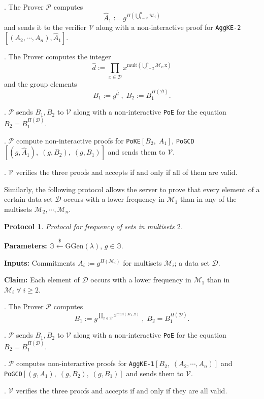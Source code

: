 \documentclass[11pt, lettersize, notitlepage, leqno, footskip=0.6cm]{article}
\newcommand{\pl}{\prod\limits}
\newcommand{\mc}{\mathcal}
\newcommand{\mb}{\mathbb}
\newcommand{\mr}{\mathrm}
\newcommand{\lamb}{\lambda}
\newcommand{\what}{\widehat}
\newcommand{\mP}{\mc{P}}
\newcommand{\V}{\mc{V}}
\newcommand{\vs}{\vspace{-0.15cm}}
\newcommand{\noin}{\noindent}
\newtheorem{Prot}[Thm]{Protocol}
\numberwithin{equation}{section}
\begin{document}
\begin{prf1}\noin {}. The Prover $\mP$ computes \vs $$\what{A}_1:= g^{\Pi\left(\bigcup\limits_{i=2}^n \mc{M}_i\right)} $$ and sends it to the verifier $\V$ along with a non-interactive proof for \verb|AggKE-2|$[(A_2,\cdots,A_n), \what{A}_1]$.

\noin 2. The Prover computes the integer \vs $$\what{d}:= \pl_{x\in \mc{D}} x^{\mr{mult\left(\bigcup\limits_{i=2}^n \mc{M}_i, x\right)}} $$ and the group elements \vs $$B_1:= g^{\what{d}}\;,\;B_2:= B_1^{\Pi(\mc{D})} .$$

\noin 3. $\mP$ sends $B_1, B_2$ to $\V$ along with a non-interactive \verb|PoE| for the equation $B_2= B_1^{\Pi(\mc{D})}$.

\noin 4. $\mP$ compute non-interactive proofs for \verb|PoKE|$[B_2,\;A_1]$, \verb|PoGCD|$[(g, \what{A}_1),\;(g, B_2),\;(g, B_1)]$ and sends them to $\V$.

\noin 5. $\V$ verifies the three proofs and accepts if and only if all of them are valid.\end{prf1}

Similarly, the following protocol allows the server to prove that every element of a certain data set $\mc{D}$ occurs with a lower frequency in $\mc{M}_1$ than in any of the multisets $\mc{M}_2,\cdots,\mc{M}_n$.

\begin{Prot} Protocol for frequency of sets in multisets $2$.\end{Prot} \vspace{-0.3cm}

\noin \textbf{Parameters:} $\mb{G}\xleftarrow{\$} \mr{GGen}(\lamb)$,\; $g\in \mb{G}$.

\noin \textbf{Inputs:} Commitments $A_i := g^{\Pi(\mc{M}_i)}$ for multisets $\mc{M}_i$; a data set $\mc{D}$.

\noin \textbf{Claim:} Each element of $\mc{D}$ occurs with a lower frequency in $\mc{M}_1$ than in $\mc{M}_i\;\forall\;i\geq 2$.

\begin{prf1}\noin {}. The Prover $\mP$ computes \vs $$B_1:= g^{\pl_{x\in\mc{D}} x^{\mr{mult(\mc{M}_1, x)}}}\;,\; B_2 = B_1^{\Pi(\mc{D})}.$$

\noin 2. $\mP$ sends $B_1, B_2$ to $\V$ along with a non-interactive \verb|PoE| for the equation $B_2= B_1^{\Pi(\mc{D})}$.

\noin 3. $\mP$ computes non-interactive proofs for \verb|AggKE-1|$[B_2,\;(A_2,\cdots,A_n)]$ and\\ \verb|PoGCD|$[(g, A_1),\;(g, B_2),\;(g,B_1)]$ and sends them to $\V$.

\noin 4. $\V$ verifies the three proofs and accepts if and only if they are all valid.\end{prf1}
\end{document}
